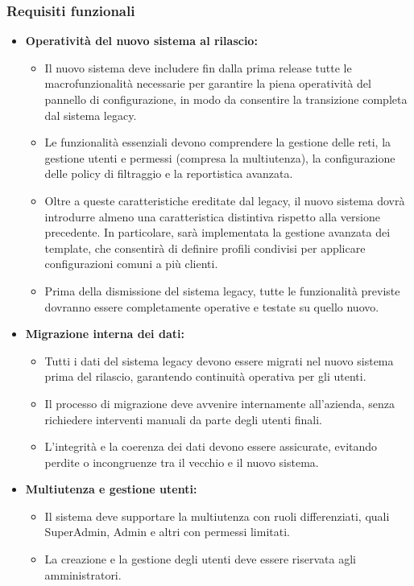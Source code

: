 \subsubsection{Requisiti funzionali}
\begin{itemize}
  \item \textbf{Operatività del nuovo sistema al rilascio:}
    \begin{itemize}
      \item Il nuovo sistema deve includere fin dalla prima release tutte le macrofunzionalità necessarie per garantire la piena operatività del pannello di configurazione, in modo da consentire la transizione completa dal sistema legacy.
      \item Le funzionalità essenziali devono comprendere la gestione delle reti, la gestione utenti e permessi (compresa la multiutenza), la configurazione delle policy di filtraggio e la reportistica avanzata.
      \item Oltre a queste caratteristiche ereditate dal legacy, il nuovo sistema dovrà introdurre almeno una caratteristica distintiva rispetto alla versione precedente. In particolare, sarà implementata la gestione avanzata dei template, che consentirà di definire profili condivisi per applicare configurazioni comuni a più clienti.
      \item Prima della dismissione del sistema legacy, tutte le funzionalità previste dovranno essere completamente operative e testate su quello nuovo.
    \end{itemize}

  \item \textbf{Migrazione interna dei dati:}
    \begin{itemize}
      \item Tutti i dati del sistema legacy devono essere migrati nel nuovo sistema prima del rilascio, garantendo continuità operativa per gli utenti.
      \item Il processo di migrazione deve avvenire internamente all’azienda, senza richiedere interventi manuali da parte degli utenti finali.
      \item L’integrità e la coerenza dei dati devono essere assicurate, evitando perdite o incongruenze tra il vecchio e il nuovo sistema.
    \end{itemize}

  \item \textbf{Multiutenza e gestione utenti:}
    \begin{itemize}
      \item Il sistema deve supportare la multiutenza con ruoli differenziati, quali SuperAdmin, Admin e altri con permessi limitati.
      \item La creazione e la gestione degli utenti deve essere riservata agli amministratori.
    \end{itemize}


\end{itemize}
